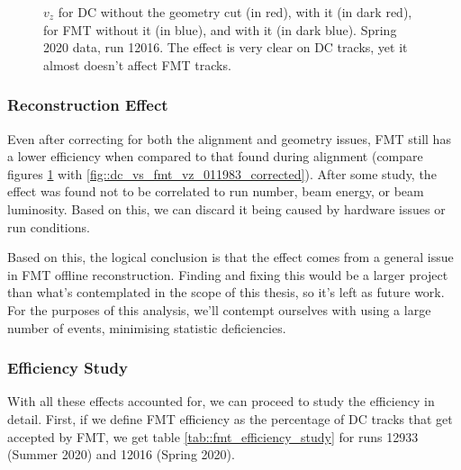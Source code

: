         \begin{figure}[h!]
            \centering{}
            \caption[$v_z$ for DC and FMT, w/ and w/out the geometry cut, run 12016]{$v_z$ for DC without the geometry cut (in red), with it (in dark red), for FMT without it (in blue), and with it (in dark blue). Spring 2020 data, run 12016. The effect is very clear on DC tracks, yet it almost doesn't affect FMT tracks.}
            \label{fig::vz_012016_geomcut}
        \end{figure}

    \subsubsection{Reconstruction Effect}
        Even after correcting for both the alignment and geometry issues, FMT still has a lower efficiency when compared to that found during alignment (compare figures \ref{fig::vz_012016_geomcut} with \ref{fig::dc_vs_fmt_vz_011983_corrected}).
        After some study, the effect was found not to be correlated to run number, beam energy, or beam luminosity.
        Based on this, we can discard it being caused by hardware issues or run conditions.

        Based on this, the logical conclusion is that the effect comes from a general issue in FMT offline reconstruction.
        Finding and fixing this would be a larger project than what's contemplated in the scope of this thesis, so it's left as future work.
        For the purposes of this analysis, we'll contempt ourselves with using a large number of events, minimising statistic deficiencies.

    \subsubsection{Efficiency Study}
        With all these effects accounted for, we can proceed to study the efficiency in detail.
        First, if we define FMT efficiency as the percentage of DC tracks that get accepted by FMT, we get table \ref{tab::fmt_efficiency_study} for runs 12933 (Summer 2020) and 12016 (Spring 2020).

